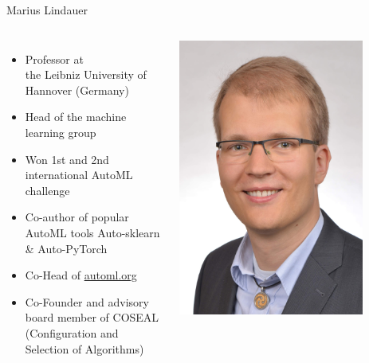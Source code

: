 \begin{frame}[c]{Marius Lindauer}

\begin{columns}


	\begin{itemize}
		\item Professor at\\ the Leibniz University of Hannover (Germany)
		\item Head of the machine learning group
		\item Won 1st and 2nd international AutoML challenge
		\item Co-author of popular AutoML tools Auto-sklearn \& Auto-PyTorch
		\item Co-Head of \url{automl.org}
		\item Co-Founder and advisory board member of COSEAL\\ (Configuration and Selection of Algorithms)
	\end{itemize}


	\includegraphics[width=0.8\textwidth]{images/marius2.jpg}

\end{columns}

\end{frame}
